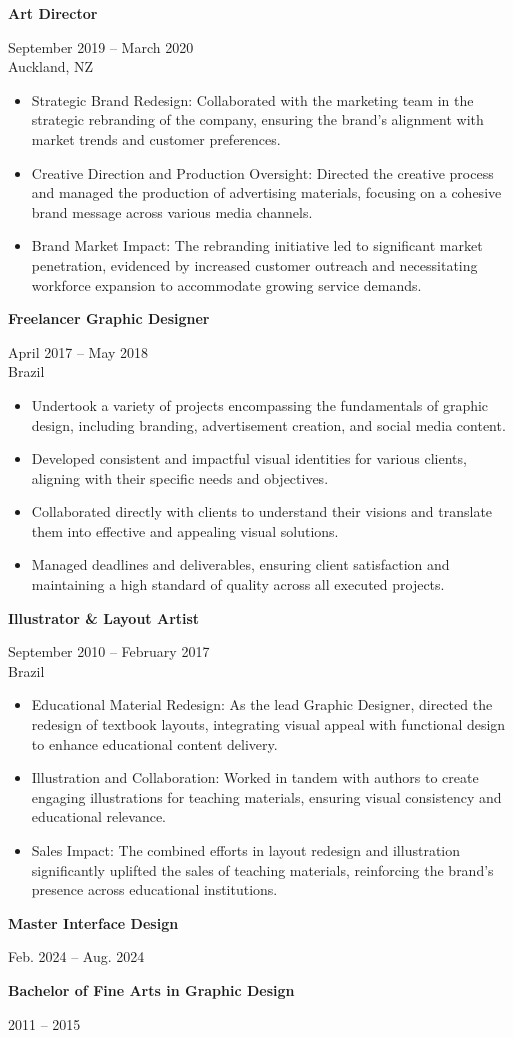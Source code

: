 \documentclass[10pt,a4paper,ragged2e,withhyper]{altacv}
\renewcommand{\cvevent}[4]{%
  \textbf{#1} %
  \hfill %
  \begin{minipage}[t]{.5\linewidth}
    \raggedleft %
    \small#3 %
    \\ %
    #4 %
  \end{minipage}
  \vspace{\baselineskip} %
}
\begin{document}
\divider

\cvevent{Art Director}{Clean.com}{September 2019 -- March 2020}{Auckland, NZ}
\begin{itemize}
  \item Strategic Brand Redesign: Collaborated with the marketing team in the strategic rebranding of the company, ensuring the brand's alignment with market trends and customer preferences.
  \item Creative Direction and Production Oversight: Directed the creative process and managed the production of advertising materials, focusing on a cohesive brand message across various media channels.
  \item Brand Market Impact: The rebranding initiative led to significant market penetration, evidenced by increased customer outreach and necessitating workforce expansion to accommodate growing service demands.
\end{itemize}

\divider

\cvevent{Freelancer Graphic Designer}{}{April 2017 -- May 2018}{Brazil}
\begin{itemize}
  \item Undertook a variety of projects encompassing the fundamentals of graphic design, including branding, advertisement creation, and social media content.
  \item Developed consistent and impactful visual identities for various clients, aligning with their specific needs and objectives.
  \item Collaborated directly with clients to understand their visions and translate them into effective and appealing visual solutions.
  \item Managed deadlines and deliverables, ensuring client satisfaction and maintaining a high standard of quality across all executed projects.
\end{itemize}

\divider

\cvevent{Illustrator \& Layout Artist}{Editora Teth}{September 2010 -- February 2017}{Brazil}
\begin{itemize}
  \item Educational Material Redesign: As the lead Graphic Designer, directed the redesign of textbook layouts, integrating visual appeal with functional design to enhance educational content delivery.
  \item Illustration and Collaboration: Worked in tandem with authors to create engaging illustrations for teaching materials, ensuring visual consistency and educational relevance.
  \item Sales Impact: The combined efforts in layout redesign and illustration significantly uplifted the sales of teaching materials, reinforcing the brand's presence across educational institutions.
\end{itemize}

\vspace{0.5cm}


\cvevent{Master Interface Design}{Aela}{Feb. 2024 -- Aug. 2024}{}

\divider

\cvevent{Bachelor of Fine Arts in Graphic Design}{Universidade Estácio de Sá}{2011 -- 2015}{}
\end{document}
